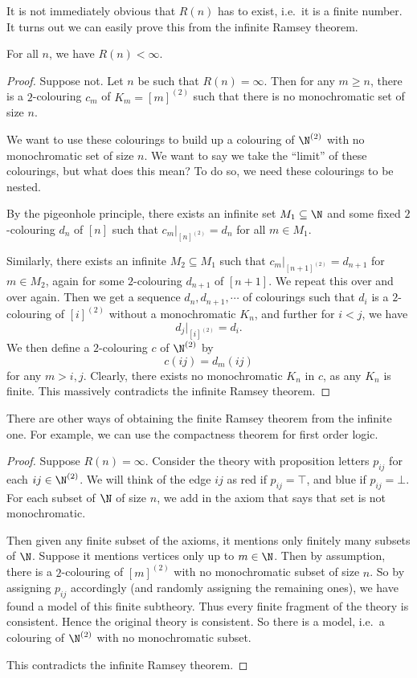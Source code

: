 \documentclass[a4paper]{article}
\begin{document}
It is not immediately obvious that $R(n)$ has to exist, i.e.\ it is a finite number. It turns out we can easily prove this from the infinite Ramsey theorem.
\begin{thm}
  For all $n$, we have $R(n) < \infty$.
\end{thm}

\begin{proof}
  Suppose not. Let $n$ be such that $R(n) = \infty$. Then for any $m \geq n$, there is a $2$-colouring $c_m$ of $K_m = [m]^{(2)}$ such that there is no monochromatic set of size $n$.

  We want to use these colourings to build up a colouring of $\N^{(2)}$ with no monochromatic set of size $n$. We want to say we take the ``limit'' of these colourings, but what does this mean? To do so, we need these colourings to be nested.

  By the pigeonhole principle, there exists an infinite set $M_1 \subseteq \N$ and some fixed $2$-colouring $d_n$ of $[n]$ such that $c_m|_{[n]^{(2)}} = d_n$ for all $m \in M_1$.

  Similarly, there exists an infinite $M_2 \subseteq M_1$ such that $c_m|_{[n + 1]^{(2)}} = d_{n + 1}$ for $m \in M_2$, again for some $2$-colouring $d_{n + 1}$ of $[n + 1]$. We repeat this over and over again. Then we get a sequence $d_n, d_{n + 1}, \cdots$ of colourings such that $d_i$ is a $2$-colouring of $[i]^{(2)}$ without a monochromatic $K_n$, and further for $i < j$, we have
  \[
    d_j|_{[i]^{(2)}} = d_i.
  \]
  We then define a $2$-colouring $c$ of $\N^{(2)}$ by
  \[
    c(ij) = d_m(ij)
  \]
  for any $m > i, j$. Clearly, there exists no monochromatic $K_n$ in $c$, as any $K_n$ is finite. This massively contradicts the infinite Ramsey theorem.
\end{proof}

There are other ways of obtaining the finite Ramsey theorem from the infinite one. For example, we can use the compactness theorem for first order logic.
\begin{proof}
  Suppose $R(n) = \infty$. Consider the theory with proposition letters $p_{ij}$ for each $ij \in \N^{(2)}$. We will think of the edge $ij$ as red if $p_{ij} = \top$, and blue if $p_{ij} = \bot$. For each subset of $\N$ of size $n$, we add in the axiom that says that set is not monochromatic.

  Then given any finite subset of the axioms, it mentions only finitely many subsets of $\N$. Suppose it mentions vertices only up to $m \in \N$. Then by assumption, there is a $2$-colouring of $[m]^{(2)}$ with no monochromatic subset of size $n$. So by assigning $p_{ij}$ accordingly (and randomly assigning the remaining ones), we have found a model of this finite subtheory. Thus every finite fragment of the theory is consistent. Hence the original theory is consistent. So there is a model, i.e.\ a colouring of $\N^{(2)}$ with no monochromatic subset.

  This contradicts the infinite Ramsey theorem.
\end{proof}
\end{document}
